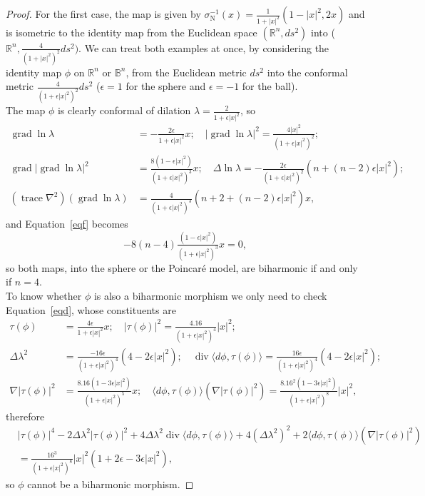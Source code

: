 \documentclass[12pt]{amsart}
\theoremstyle{plain}
\theoremstyle{definition}
\begin{document}
\begin{proof}
For the first case, the map is given by $\sigma_{\mathrm N}^{-1}(x) = \tfrac{1}{1+ |x|^2}
(1-|x|^2 , 2x)$ and is isometric to the identity map from the Euclidean space $({{\mathbb R}}^n ,ds^2)$ into
(${{\mathbb R}}^{n},\tfrac{4}{(1+ |x|^2)^2}ds^2)$. We can treat both examples at once, by considering the identity map 
$\phi$ on ${{\mathbb R}}^n$ or ${{\mathbb B}}^n$, from the Euclidean metric $ds^2$ into the conformal metric $\tfrac{4}{(1+ \epsilon |x|^2)^2}ds^2$
($\epsilon = 1$ for the sphere and $\epsilon = -1$ for the ball).\\
The map $\phi$ is  clearly conformal of dilation $\lambda = \tfrac{2}{1+ \epsilon |x|^2}$, so
\begin{align*}
\operatorname{grad} \ln\lambda &= -\tfrac{2\epsilon}{1+ \epsilon |x|^2} x ; \quad |\operatorname{grad} \ln\lambda|^2 = \tfrac{4|x|^2}{(1+ \epsilon |x|^2)^2}; \\
\operatorname{grad}|\operatorname{grad} \ln\lambda|^2 &= \tfrac{8(1- \epsilon |x|^2)}{(1+ \epsilon |x|^2)^3} x ; \quad
\Delta \ln\lambda = -\tfrac{2\epsilon}{(1+ \epsilon |x|^2)^2}(n + (n-2)\epsilon |x|^2) ;\\
(\operatorname{trace}\nabla^2) (\operatorname{grad}\ln\lambda)  &= \tfrac{4}{(1+ \epsilon |x|^2)^3}(n+2 +
(n-2)\epsilon|x|^2)x,
\end{align*}
and Equation~\eqref{eqf} becomes
$$-8(n-4)\tfrac{(1- \epsilon|x|^2)}{(1+ \epsilon |x|^2)^3} x =0 ,$$
so both maps, into the sphere or the Poincar{\'e} model, are biharmonic if and only if $n=4$.\\
To know whether $\phi$ is also a biharmonic morphism we only
need to check Equation~\eqref{eqd}, whose constituents are
\begin{align*}
\tau(\phi) &= \tfrac{4\epsilon}{1+ \epsilon |x|^2} x ; \quad |\tau(\phi)|^2 = \tfrac{4.16}{(1+ \epsilon |x|^2)^4} |x|^2 ;\\
\Delta \lambda^2 &= \tfrac{-16\epsilon}{(1+ \epsilon |x|^2)^4} (4-2\epsilon|x|^2) ; \quad
\operatorname{div} \langle d\phi ,\tau(\phi)\rangle  = \tfrac{16\epsilon}{(1+ \epsilon |x|^2)^4} (4-2\epsilon|x|^2) ;\\
\nabla |\tau(\phi)|^2 &= \tfrac{8.16(1-3\epsilon|x|^2)}{(1+\epsilon|x|^2)^5} x ;
\quad \langle d\phi ,\tau(\phi)\rangle (\nabla |\tau(\phi)|^2) = \tfrac{8.16^2
(1-3\epsilon|x|^2)}{(1+\epsilon|x|^2)^8} |x|^2 ,
\end{align*}
therefore
\begin{align*}
&|\tau(\phi)|^{4} - 2\Delta \lambda^{2} |\tau(\phi)|^{2} + 4 \Delta \lambda^{2}
\operatorname{div}{\langle d\phi , \tau(\phi)\rangle} + 4 (\Delta \lambda^{2})^{2} +
2 \langle d\phi , \tau(\phi) \rangle (\nabla |\tau(\phi)|^{2}) \\
&= \tfrac{16^3}{(1+\epsilon|x|^2)^8} |x|^2 (1+2 \epsilon -3\epsilon |x|^2),
\end{align*}
so $\phi$ cannot be a biharmonic morphism.
\end{proof}
\end{document}
